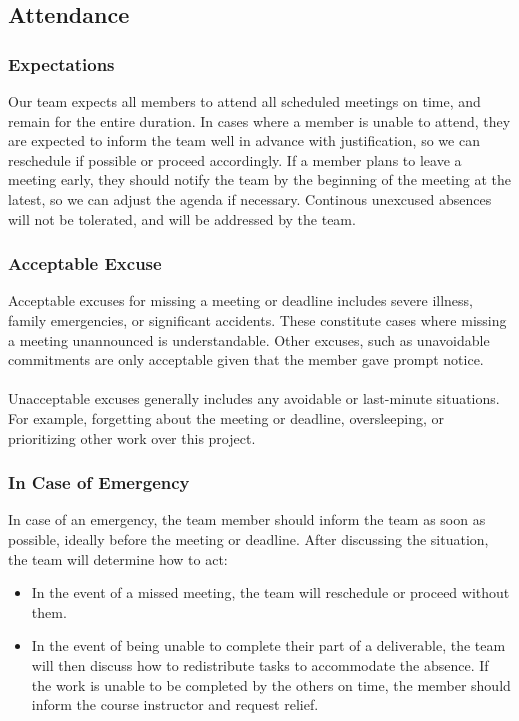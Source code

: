 \documentclass{article}
\begin{document}
\subsection*{Attendance}

\subsubsection*{Expectations}

Our team expects all members to attend all scheduled meetings on time, and remain for the entire duration. In cases where a member is unable to attend, they are expected to inform the team well in advance with justification, so we can reschedule if possible or proceed accordingly. If a member plans to leave a meeting early, they should notify the team by the beginning of the meeting at the latest, so we can adjust the agenda if necessary. Continous unexcused absences will not be tolerated, and will be addressed by the team.

\subsubsection*{Acceptable Excuse}

Acceptable excuses for missing a meeting or deadline includes severe illness, family emergencies, or significant accidents. These constitute cases where missing a meeting unannounced is understandable. Other excuses, such as unavoidable commitments are only acceptable given that the member gave prompt notice. \\\\
Unacceptable excuses generally includes any avoidable or last-minute situations. For example, forgetting about the meeting or deadline, oversleeping, or prioritizing other work over this project.

\subsubsection*{In Case of Emergency}

In case of an emergency, the team member should inform the team as soon as possible, ideally before the meeting or deadline. After discussing the situation, the team will determine how to act:
\begin{itemize}
  \item In the event of a missed meeting, the team will reschedule or proceed without them.
  \item In the event of being unable to complete their part of a deliverable, the team will then discuss how to redistribute tasks to accommodate the absence. If the work is unable to be completed by the others on time, the member should inform the course instructor and request relief.
\end{itemize}
\end{document}
